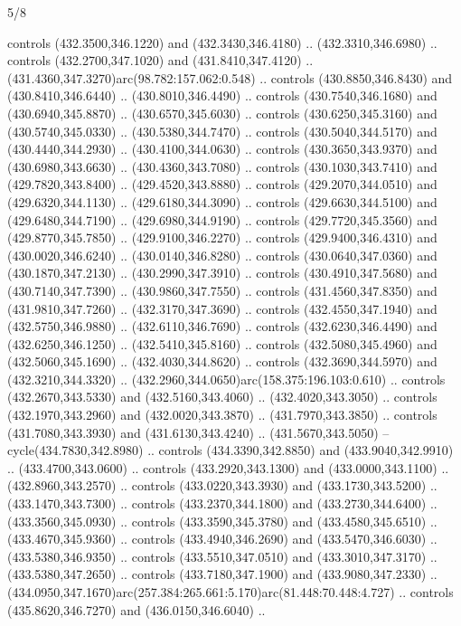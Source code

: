 \begin{flagdescription}{5/8}
\begin{scope}[xshift=0.5\flaglength,yshift=0.5\flagwidth,scale=\flagwidth/475.63]
\begin{scope}[y=0.8pt, x=0.8pt, yscale=-1, xscale=1,shift={(-450,-300)}]
\begin{scope}[cm={{1.0,0.0,0.0,1.0,(-0.0002,0.12556)}},cm={{1.0,0.0,0.0,1.0,(0.00179,0.0)}}]
\begin{scope}[cm={{1.01375,0.0,0.0,1.01375,(-5.36379,-4.94943)}}]
  controls (432.3500,346.1220) and (432.3430,346.4180) .. (432.3310,346.6980) ..
  controls (432.2700,347.1020) and (431.8410,347.4120) ..
  (431.4360,347.3270)arc(98.782:157.062:0.548) .. controls (430.8850,346.8430)
  and (430.8410,346.6440) .. (430.8010,346.4490) .. controls (430.7540,346.1680)
  and (430.6940,345.8870) .. (430.6570,345.6030) .. controls (430.6250,345.3160)
  and (430.5740,345.0330) .. (430.5380,344.7470) .. controls (430.5040,344.5170)
  and (430.4440,344.2930) .. (430.4100,344.0630) .. controls (430.3650,343.9370)
  and (430.6980,343.6630) .. (430.4360,343.7080) .. controls (430.1030,343.7410)
  and (429.7820,343.8400) .. (429.4520,343.8880) .. controls (429.2070,344.0510)
  and (429.6320,344.1130) .. (429.6180,344.3090) .. controls (429.6630,344.5100)
  and (429.6480,344.7190) .. (429.6980,344.9190) .. controls (429.7720,345.3560)
  and (429.8770,345.7850) .. (429.9100,346.2270) .. controls (429.9400,346.4310)
  and (430.0020,346.6240) .. (430.0140,346.8280) .. controls (430.0640,347.0360)
  and (430.1870,347.2130) .. (430.2990,347.3910) .. controls (430.4910,347.5680)
  and (430.7140,347.7390) .. (430.9860,347.7550) .. controls (431.4560,347.8350)
  and (431.9810,347.7260) .. (432.3170,347.3690) .. controls (432.4550,347.1940)
  and (432.5750,346.9880) .. (432.6110,346.7690) .. controls (432.6230,346.4490)
  and (432.6250,346.1250) .. (432.5410,345.8160) .. controls (432.5080,345.4960)
  and (432.5060,345.1690) .. (432.4030,344.8620) .. controls (432.3690,344.5970)
  and (432.3210,344.3320) .. (432.2960,344.0650)arc(158.375:196.103:0.610) ..
  controls (432.2670,343.5330) and (432.5160,343.4060) .. (432.4020,343.3050) ..
  controls (432.1970,343.2960) and (432.0020,343.3870) .. (431.7970,343.3850) ..
  controls (431.7080,343.3930) and (431.6130,343.4240) .. (431.5670,343.5050) --
  cycle(434.7830,342.8980) .. controls (434.3390,342.8850) and
  (433.9040,342.9910) .. (433.4700,343.0600) .. controls (433.2920,343.1300) and
  (433.0000,343.1100) .. (432.8960,343.2570) .. controls (433.0220,343.3930) and
  (433.1730,343.5200) .. (433.1470,343.7300) .. controls (433.2370,344.1800) and
  (433.2730,344.6400) .. (433.3560,345.0930) .. controls (433.3590,345.3780) and
  (433.4580,345.6510) .. (433.4670,345.9360) .. controls (433.4940,346.2690) and
  (433.5470,346.6030) .. (433.5380,346.9350) .. controls (433.5510,347.0510) and
  (433.3010,347.3170) .. (433.5380,347.2650) .. controls (433.7180,347.1900) and
  (433.9080,347.2330) ..
  (434.0950,347.1670)arc(257.384:265.661:5.170)arc(81.448:70.448:4.727) ..
  controls (435.8620,346.7270) and (436.0150,346.6040) ..

\end{scope}
\end{scope}
\end{scope}
\end{scope}
\end{flagdescription}
